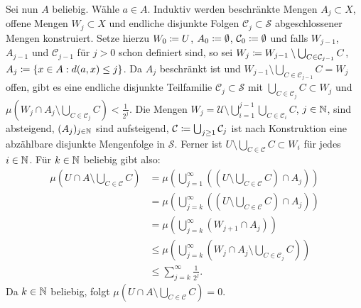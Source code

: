 \documentclass[a4paper,twoside,DIV15,BCOR12mm]{scrbook}
\begin{document}
\begin{beweis}
Sei nun $A$ beliebig. Wähle $a\in A$. Induktiv werden beschränkte Mengen $A_j\subset X$, offene Mengen $W_j\subset X$ und endliche disjunkte Folgen $\mathcal C_j\subset\mathcal S$ abgeschlossener Mengen konstruiert. Setze hierzu $W_0\da U$, $A_0\da \emptyset$, $\mathcal C_0\da \emptyset$ und falls $W_{j-1}$, $A_{j-1}$ und $\mathcal C_{j-1}$ für $j>0$ schon definiert sind, so sei $W_j \da W_{j-1} \setminus \bigcup_{C\in\mathcal C_{j-1}}C$, $A_j \da \{x\in A: d(a,x)\le j\}$. Da $A_j$ beschränkt ist und $W_{j-1}\setminus \bigcup_{C\in\mathcal C_{j-1}}C = W_j$ offen, gibt es eine endliche disjunkte Teilfamilie $\mathcal C_j\subset \mathcal S$ mit $\bigcup_{C\in\mathcal C_j} C \subset W_j$ und $\mu(W_j\cap A_j \setminus \bigcup_{C\in\mathcal C_j} C) <\frac1{2^j}$. Die Mengen $W_j = \mathcal U\setminus \bigcup_{i=1}^{j-1} \bigcup_{C\in\mathcal C_i} C$, $j\in\mathbb{N}$, sind absteigend, $(A_j)_{j\in\mathbb{N}}$ sind aufsteigend, $\mathcal C\da \bigcup_{j\ge 1}\mathcal C_j$ ist nach Konstruktion eine abzählbare disjunkte Mengenfolge in $\mathcal S$. Ferner ist $U\setminus \bigcup_{C\in\mathcal C}C\subset W_i$ für jedes $i\in\mathbb{N}$. Für $k\in\mathbb{N}$ beliebig gibt also:
\begin{align*}
\mu(U\cap A \setminus\bigcup_{C\in\mathcal C} C)
&= \mu(\bigcup_{j=1}^\infty ( (U\setminus \bigcup_{C\in\mathcal C}C)\cap A_j )) \\
&= \mu(\bigcup_{j=k}^\infty ( (U\setminus \bigcup_{C\in\mathcal C}C)\cap A_j )) \\
&= \mu(\bigcup_{j=k}^\infty (W_{j+1} \cap A_j) )\\
&\le \mu(\bigcup_{j=k}^\infty (W_j \cap A_j \setminus \bigcup_{C\in\mathcal C_j}C)) \\
&\le \sum_{j=k}^\infty \frac1{2^j}.
\end{align*}
Da $k\in\mathbb{N}$ beliebig, folgt $\mu(U\cap A \setminus\bigcup_{C\in\mathcal C} C) = 0$.
\end{beweis}
\end{document}
